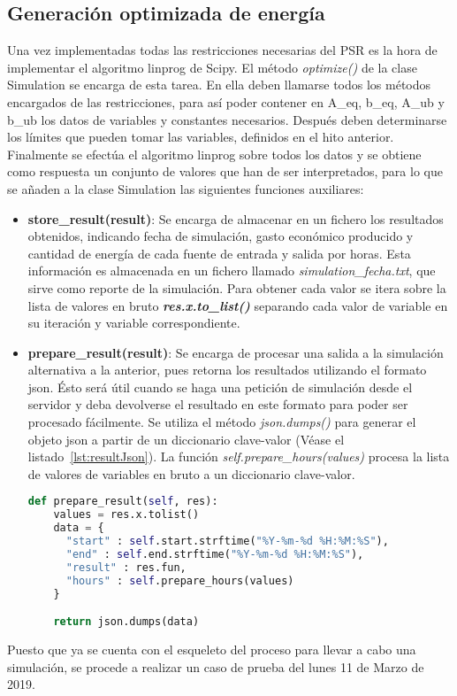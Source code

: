 \subsection{Generación optimizada de energía}
Una vez implementadas todas las restricciones necesarias del PSR es la hora de implementar el algoritmo linprog de Scipy. El método \textit{optimize()} de la clase Simulation se encarga de esta tarea. En ella deben llamarse todos los métodos encargados de las restricciones, para así poder contener en A\_eq, b\_eq, A\_ub y b\_ub los datos de variables y constantes necesarios. Después deben determinarse los límites que pueden tomar las variables, definidos en el hito anterior. Finalmente se efectúa el algoritmo linprog sobre todos los datos y se obtiene como respuesta un conjunto de valores que han de ser interpretados, para lo que se añaden a la clase Simulation las siguientes funciones auxiliares:
\begin{itemize}
\item \textbf{store\_result(result)}: Se encarga de almacenar en un fichero los resultados obtenidos, indicando fecha de simulación, gasto económico producido y cantidad de energía de cada fuente de entrada y salida por horas. Esta información es almacenada en un fichero llamado \textit{simulation\_fecha.txt}, que sirve como reporte de la simulación. Para obtener cada valor se itera sobre la lista de valores en bruto \textbf{\textit{res.x.to\_list()}} separando cada valor de variable en su iteración y variable correspondiente.
\item \textbf{prepare\_result(result)}: Se encarga de procesar una salida a la simulación alternativa a la anterior, pues retorna los resultados utilizando el formato json. Ésto será útil cuando se haga una petición de simulación desde el servidor y deba devolverse el resultado en este formato para poder ser procesado fácilmente. Se utiliza el método \textit{json.dumps()} para generar el objeto json a partir de un diccionario clave-valor (Véase el listado~\ref{lst:resultJson}). La función \textit{self.prepare\_hours(values)} procesa la lista de valores de variables en bruto a un diccionario clave-valor.
\begin{lstlisting}[language=Python,float=ht,caption={Función de procesamiento del resultado a formato json},label={lst:resultJson}]
def prepare_result(self, res):
    values = res.x.tolist()
    data = {
      "start" : self.start.strftime("%Y-%m-%d %H:%M:%S"),
      "end" : self.end.strftime("%Y-%m-%d %H:%M:%S"),
      "result" : res.fun,
      "hours" : self.prepare_hours(values)
    }

    return json.dumps(data)
\end{lstlisting}
\end{itemize}
Puesto que ya se cuenta con el esqueleto del proceso para llevar a cabo una simulación, se procede a realizar un caso de prueba del lunes 11 de Marzo de 2019.
